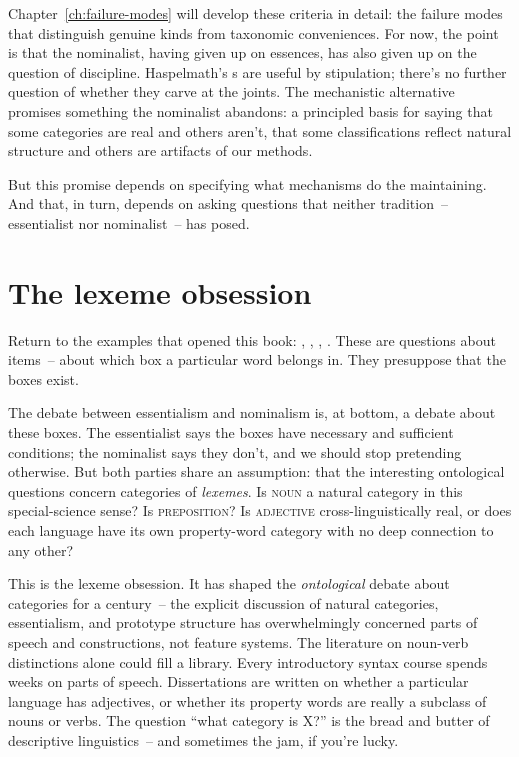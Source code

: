 Chapter~\ref{ch:failure-modes} will develop these criteria in detail: the failure modes that distinguish genuine kinds from taxonomic conveniences. For now, the point is that the nominalist, having given up on essences, has also given up on the question of discipline. Haspelmath's s are useful by stipulation; there's no further question of whether they carve at the joints. The mechanistic alternative promises something the nominalist abandons: a principled basis for saying that some categories are real and others aren't, that some classifications reflect natural structure and others are artifacts of our methods.

But this promise depends on specifying what mechanisms do the maintaining. And that, in turn, depends on asking questions that neither tradition~-- essentialist nor nominalist~-- has posed.

\section{The lexeme obsession}
\label{sec:3:lexeme-obsession}

Return to the examples that opened this book: , , , . These are questions about items~-- about which box a particular word belongs in. They presuppose that the boxes exist.

The debate between essentialism and nominalism is, at bottom, a debate about these boxes. The essentialist says the boxes have necessary and sufficient conditions; the nominalist says they don't, and we should stop pretending otherwise. But both parties share an assumption: that the interesting ontological questions concern categories of \emph{lexemes}. Is \textsc{noun} a natural category in this special-science sense? Is \textsc{preposition}? Is \textsc{adjective} cross-linguistically real, or does each language have its own property-word category with no deep connection to any other?

This is the lexeme obsession. It has shaped the \emph{ontological} debate about categories for a century~-- the explicit discussion of natural categories, essentialism, and prototype structure has overwhelmingly concerned parts of speech and constructions, not feature systems. The literature on noun-verb distinctions alone could fill a library. Every introductory syntax course spends weeks on parts of speech. Dissertations are written on whether a particular language has adjectives, or whether its property words are really a subclass of nouns or verbs. The question \enquote{what category is X?} is the bread and butter of descriptive linguistics~-- and sometimes the jam, if you're lucky.

